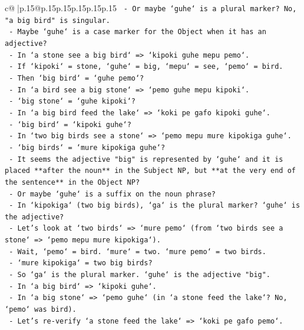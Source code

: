\documentclass{article}
\begin{document}
{\begin{supertabular}{c@{$\;$}|p{.15\linewidth}@{}p{.15\linewidth}p{.15\linewidth}p{.15\linewidth}p{.15\linewidth}p{.15\linewidth}}
{{{\texttt{    {-} Or maybe `guhe` is a plural marker? No, "a big bird" is singular.} \\
\texttt{    {-} Maybe `guhe` is a case marker for the Object when it has an adjective?} \\
\texttt{    {-} In `a stone see a big bird` => `kipoki guhe mepu pemo`.} \\
\texttt{      {-} If `kipoki` = stone, `guhe` = big, `mepu` = see, `pemo` = bird.} \\
\texttt{      {-} Then `big bird` = `guhe pemo`?} \\
\texttt{      {-} In `a bird see a big stone` => `pemo guhe mepu kipoki`.} \\
\texttt{      {-} `big stone` = `guhe kipoki`?} \\
\texttt{      {-} In `a big bird feed the lake` => `koki pe gafo kipoki guhe`.} \\
\texttt{      {-} `big bird` = `kipoki guhe`?} \\
\texttt{      {-} In `two big birds see a stone` => `pemo mepu mure kipokiga guhe`.} \\
\texttt{      {-} `big birds` = `mure kipokiga guhe`?} \\
\texttt{      {-} It seems the adjective "big" is represented by `guhe` and it is placed **after the noun** in the Subject NP, but **at the very end of the sentence** in the Object NP?} \\
\texttt{      {-} Or maybe `guhe` is a suffix on the noun phrase?} \\
\texttt{      {-} In `kipokiga` (two big birds), `ga` is the plural marker? `guhe` is the adjective?} \\
\texttt{      {-} Let's look at `two birds` => `mure pemo` (from `two birds see a stone` => `pemo mepu mure kipokiga`).} \\
\texttt{        {-} Wait, `pemo` = bird. `mure` = two. `mure pemo` = two birds.} \\
\texttt{        {-} `mure kipokiga` = two big birds?} \\
\texttt{        {-} So `ga` is the plural marker. `guhe` is the adjective "big".} \\
\texttt{        {-} In `a big bird` => `kipoki guhe`.} \\
\texttt{        {-} In `a big stone` => `pemo guhe` (in `a stone feed the lake`? No, `pemo` was bird).} \\
\texttt{        {-} Let's re{-}verify `a stone feed the lake` => `koki pe gafo pemo`.} \\
}}}
\end{supertabular}}
\end{document}
